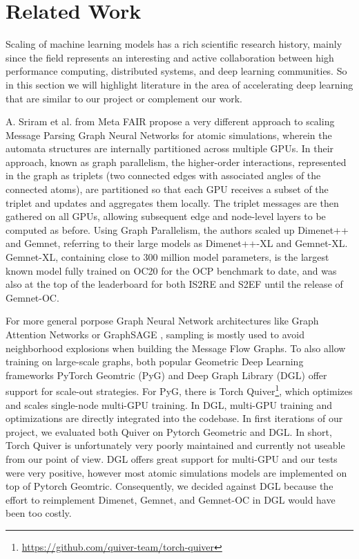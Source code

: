 \section{Related Work}
\label{section:related_work}

Scaling of machine learning models has a rich scientific research history, mainly since the field 
represents an interesting and active collaboration between high performance computing, distributed 
systems, and deep learning communities. So in this section we will highlight literature in the area 
of accelerating deep learning that are similar to our project or complement our work.

A. Sriram et al. \cite*{https://doi.org/10.48550/arxiv.2203.09697} from Meta FAIR propose a very 
different approach to scaling Message Parsing Graph Neural Networks for atomic simulations, wherein 
the automata structures are internally partitioned across multiple GPUs. In their approach, known 
as graph parallelism, the higher-order interactions, represented in the graph as triplets 
(two connected edges with associated angles of the connected atoms), are partitioned so that 
each GPU receives a subset of the triplet and updates and aggregates them locally. The 
triplet messages are then gathered on all GPUs, allowing subsequent edge and node-level layers 
to be computed as before. Using Graph Parallelism, the authors scaled up Dimenet++ and Gemnet, 
referring to their large models as Dimenet++-XL and Gemnet-XL. Gemnet-XL, containing close to 300 
million model parameters, is the largest known model fully trained on OC20 for the OCP benchmark 
to date, and was also at the top of the leaderboard for both IS2RE and S2EF until the release of 
Gemnet-OC. 

For more general porpose Graph Neural Network architectures like Graph Attention Networks 
\cite*{10.48550/ARXIV.1710.10903} or GraphSAGE \cite*{10.48550/ARXIV.1706.02216}, sampling 
is mostly used to avoid neighborhood explosions when building the Message Flow Graphs. To also 
allow training on large-scale graphs, both popular Geometric Deep Learning frameworks PyTorch 
Geomtric (PyG) \cite*{10.48550/ARXIV.1903.02428} and Deep Graph Library (DGL) 
\cite*{10.48550/ARXIV.1909.01315} offer support for scale-out strategies. For PyG, there is 
Torch Quiver\footnote{\url{https://github.com/quiver-team/torch-quiver}}, which optimizes and 
scales single-node multi-GPU training. In DGL, multi-GPU training and optimizations are directly 
integrated into the codebase. In first iterations of our project, we evaluated both Quiver 
on Pytorch Geometric and DGL. In short, Torch Quiver is unfortunately very poorly maintained 
and currently not useable from our point of view. DGL offers great support for multi-GPU and 
our tests were very positive, however most atomic simulations models are implemented on top 
of Pytorch Geomtric. Consequently, we decided against DGL because the effort to reimplement 
Dimenet, Gemnet, and Gemnet-OC in DGL would have been too costly. 


